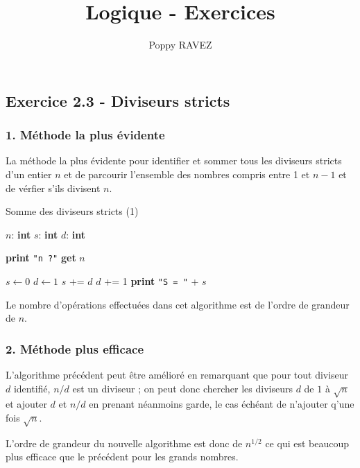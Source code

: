 \documentclass[a4paper,10pt]{report}
\title{Logique - Exercices}
\author{Poppy RAVEZ}
\newcommand\Printtt[1]{\State \textbf{print }\texttt{"#1"}}
\newcommand\Get{\State \textbf{get }}
\begin{document}
\subsection*{Exercice 2.3 - Diviseurs stricts}

\subsubsection*{1. Méthode la plus évidente}

La méthode la plus évidente pour identifier et sommer tous les diviseurs stricts d'un entier $n$ et de parcourir l'ensemble des nombres
compris entre 1 et $n-1$ et de vérfier s'ils divisent $n$.

\begin{algorithm}
	\caption{Somme des diviseurs stricts (1)}
	\begin{algorithmic}
		\Vars
		\State $n$: \textbf{int} 
		\State $s$: \textbf{int} 
		\State $d$: \textbf{int} 
		\EndVars
		
		\Statex
		\Begin
			\Printtt{n ?}
			\Get $n$
		
			\Statex
			\State $s \leftarrow 0$
			\State $d \leftarrow 1$
					\State $s$ += $d$
				\EndIf
				\State $d$ += 1
			\EndWhile
			\Printtt{S = } + $s$
		\End
	\end{algorithmic}
\end{algorithm}

Le nombre d'opérations effectuées dans cet algorithme est de l'ordre de grandeur de $n$.


\subsubsection*{2. Méthode plus efficace}

L'algorithme précédent peut être amélioré en remarquant que pour tout diviseur $d$ identifié, $n/d$
est un diviseur ; on peut donc chercher les diviseurs $d$ de $1$ à $\sqrt{n}$ et ajouter $d$ et $n/d$ en
prenant néanmoins garde, le cas échéant de n'ajouter q'une fois $\sqrt{n}$.

L'ordre de grandeur du nouvelle algorithme est donc de $n^{1/2}$ ce qui est beaucoup plus efficace
que le précédent pour les grands nombres.
\end{document}
